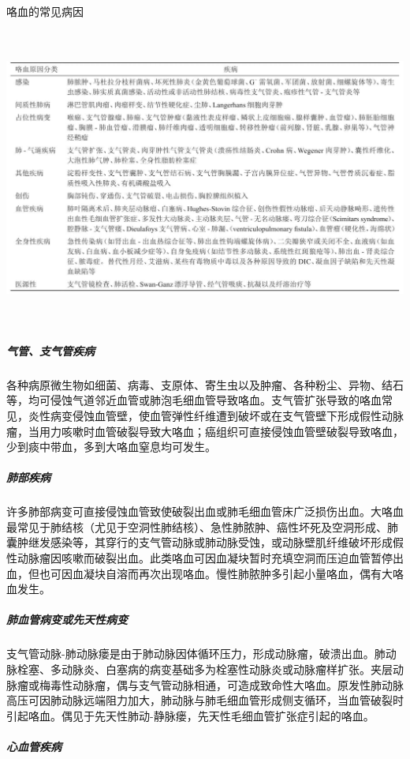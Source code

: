 \begin{table}[htbp]
\centering
\caption{咯血的常见病因}
\label{tab9-1}
\includegraphics[width=6.59375in,height=3.875in]{./images/Image00045.jpg}
\end{table}

\subparagraph{气管、支气管疾病}

各种病原微生物如细菌、病毒、支原体、寄生虫以及肿瘤、各种粉尘、异物、结石等，均可侵蚀气道邻近血管或肺泡毛细血管导致咯血。支气管扩张导致的咯血常见，炎性病变侵蚀血管壁，使血管弹性纤维遭到破坏或在支气管壁下形成假性动脉瘤，当用力咳嗽时血管破裂导致大咯血；癌组织可直接侵蚀血管壁破裂导致咯血，少到痰中带血，多到大咯血窒息均可发生。

\subparagraph{肺部疾病}

许多肺部病变可直接侵蚀血管致使破裂出血或肺毛细血管床广泛损伤出血。大咯血最常见于肺结核（尤见于空洞性肺结核）、急性肺脓肿、癌性坏死及空洞形成、肺囊肿继发感染等，其穿行的支气管动脉或肺动脉受蚀，或动脉壁肌纤维破坏形成假性动脉瘤因咳嗽而破裂出血。此类咯血可因血凝块暂时充填空洞而压迫血管暂停出血，但也可因血凝块自溶而再次出现咯血。慢性肺脓肿多引起小量咯血，偶有大咯血发生。

\subparagraph{肺血管病变或先天性病变}

支气管动脉-肺动脉瘘是由于肺动脉因体循环压力，形成动脉瘤，破溃出血。肺动脉栓塞、多动脉炎、白塞病的病变基础多为栓塞性动脉炎或动脉瘤样扩张。夹层动脉瘤或梅毒性动脉瘤，偶与支气管动脉相通，可造成致命性大咯血。原发性肺动脉高压可因肺动脉远端阻力加大，肺动脉与肺毛细血管形成侧支循环，当血管破裂时引起咯血。偶见于先天性肺动-静脉瘘，先天性毛细血管扩张症引起的咯血。

\subparagraph{心血管疾病}

